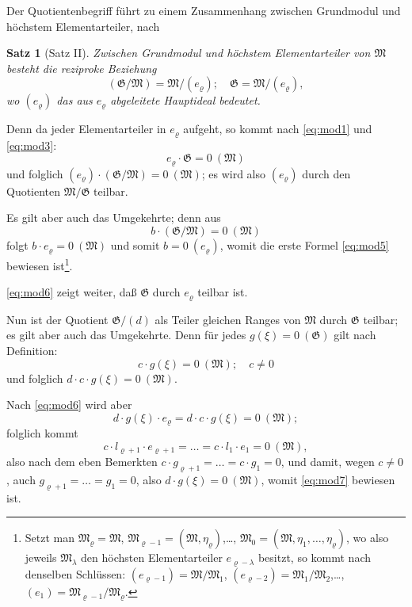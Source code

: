 \documentclass[fontsize=10pt,paper=a5,pagesize,headings=small]{scrbook}
\theoremstyle{plain}
\newtheorem*{satz}{Satz}
\begin{document}
Der Quotientenbegriff führt zu einem Zusammenhang zwischen Grundmodul und
höchstem Elementarteiler, nach

\begin{satz}[Satz II]
Zwischen Grundmodul und höchstem Elementarteiler von $\mathfrak{M}$ besteht die reziproke
Beziehung
\begin{equation}
\label{eq:mod5}
(\mathfrak{G}/\mathfrak{M}) = \mathfrak{M}/(e_\varrho);\quad \mathfrak{G} = \mathfrak{M}/(e_\varrho),
\end{equation}
wo $(e_\varrho)$ das aus $e_\varrho$ abgeleitete Hauptideal bedeutet.
\end{satz}

Denn da jeder Elementarteiler in $e_\varrho$ aufgeht, so kommt nach \eqref{eq:mod1} und
\eqref{eq:mod3}:
\begin{equation}
\label{eq:mod6}
e_\varrho \cdot \mathfrak{G} = 0\ (\mathfrak{M})
\end{equation}
und folglich $(e_\varrho) \cdot (\mathfrak{G}/\mathfrak{M}) = 0\ (\mathfrak{M})$; es wird also $(e_\varrho)$ durch den Quotienten $\mathfrak{M}/\mathfrak{G}$ teilbar.

Es gilt aber auch das Umgekehrte; denn aus
\[ b \cdot (\mathfrak{G}/\mathfrak{M}) = 0\ (\mathfrak{M}) \]
folgt $b \cdot e_\varrho = 0\ (\mathfrak{M})$ und somit $b = 0\ (e_\varrho)$, womit die erste Formel
\eqref{eq:mod5} bewiesen ist\footnote{Setzt man $\mathfrak{M}_\varrho = \mathfrak{M}$,
$\mathfrak{M}_{\varrho-1} = (\mathfrak{M},\eta_\varrho)$,\dots, $\mathfrak{M}_0 = (\mathfrak{M},\eta_1,\dots,\eta_\varrho)$,
wo also jeweils $\mathfrak{M}_\lambda$ den höchsten Elementarteiler $e_{\varrho-\lambda}$ besitzt, so kommt nach denselben
Schlüssen: $(e_{\varrho-1}) = \mathfrak{M}/\mathfrak{M}_1$, $(e_{\varrho-2}) = \mathfrak{M}_1/\mathfrak{M}_2$,\dots,
$(e_1) = \mathfrak{M}_{\varrho-1}/\mathfrak{M}_\varrho$.}.

\eqref{eq:mod6} zeigt weiter, daß $\mathfrak{G}$ durch $e_\varrho$ teilbar ist.

\newpage
\setcounter{page}{428}

Nun ist der Quotient $\mathfrak{G}/(d)$ als Teiler gleichen Ranges von $\mathfrak{M}$ durch $\mathfrak{G}$ teilbar;
es gilt aber auch das Umgekehrte. Denn für jedes $g(\xi) = 0\ (\mathfrak{G})$ gilt nach Definition:
\[ c \cdot g(\xi) = 0\ (\mathfrak{M});\quad c \neq 0 \]
und folglich $d \cdot c \cdot g(\xi) = 0\ (\mathfrak{M})$.

Nach \eqref{eq:mod6} wird aber
\[ d \cdot g(\xi) \cdot e_\varrho = d \cdot c \cdot g(\xi) = 0\ (\mathfrak{M}); \]
folglich kommt
\[ c \cdot l_{\varrho+1} \cdot e_{\varrho+1} = \dots = c \cdot l_1 \cdot e_1 = 0\ (\mathfrak{M}), \]
also nach dem eben Bemerkten $c \cdot g_{\varrho+1} = \dots = c \cdot g_1 = 0$, und damit, wegen
$c \neq 0$, auch $g_{\varrho+1} = \dots = g_1 = 0$, also $d \cdot g(\xi) = 0\ (\mathfrak{M})$, womit \eqref{eq:mod7}
bewiesen ist.
\end{document}
